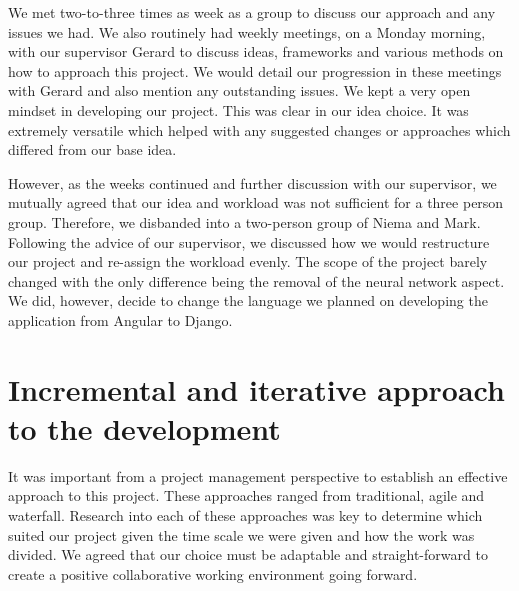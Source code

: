 We met two-to-three times as week as a group to discuss our approach and any issues we had. We also routinely had weekly meetings, on a Monday morning, with our supervisor Gerard to discuss ideas, frameworks and various methods on how to approach this project. We would detail our progression in these meetings with Gerard and also mention any outstanding issues.
We kept a very open mindset in developing our project. This was clear in our idea choice. It was extremely versatile which helped with any suggested changes or approaches which differed from our base idea. 

However, as the weeks continued and further discussion with our supervisor, we mutually agreed that our idea and workload was not sufficient for a three person group. Therefore, we disbanded into a two-person group of Niema and Mark. Following the advice of our supervisor, we discussed how we would restructure our project and re-assign the workload evenly. The scope of the project barely changed with the only difference being the removal of the neural network aspect. We did, however, decide to change the language we planned on developing the application from Angular to Django.

\section{Incremental and iterative approach to the development}
It was important from a project management perspective to establish an effective approach to this project. These approaches ranged from traditional, agile and waterfall. Research into each of these approaches was key to determine which suited our project given the time scale we were given and how the work was divided. 
We agreed that our choice must be adaptable and straight-forward to create a positive collaborative working environment going forward.


